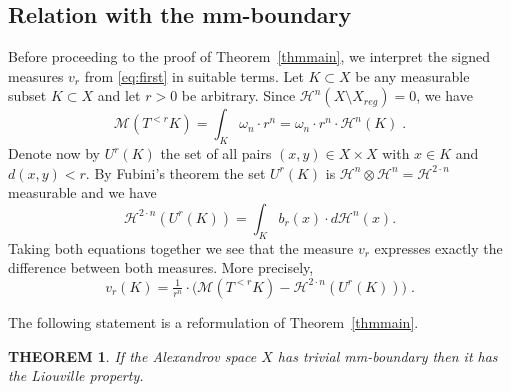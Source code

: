 \documentclass[12pt,leqno,intlimits]{amsart}
\numberwithin{equation}{section}
\newtheorem{thm}{THEOREM}[section]
\theoremstyle{definition}
\theoremstyle{remark}
\newcommand{\tref}[1]{Theorem~\ref{#1}}
\begin{document}
\subsection{Relation with the mm-boundary}
Before proceeding to the proof of  \tref{thmmain}, we interpret the signed measures $v_r$ from \eqref{eq:first} in suitable terms.
Let $K\subset X$ be   any measurable  subset $K\subset X$ and let $r>0$ be arbitrary.
Since $\mathcal H^n (X\setminus X_{reg} )=0$, we have
$$\mathcal M (T^{<r} K) =\int _K \omega _n \cdot r^n  =\omega _n \cdot r^n \cdot \mathcal H^n (K) \; .$$
Denote now by $U^r(K)$ the set of all pairs $(x,y)\in X\times X$ with $x\in K$ and $d(x,y)<r$.
By Fubini's theorem the set $U^r(K)$ is $\mathcal H^n \otimes \mathcal H^n =\mathcal H^{2\cdot n}$ measurable and we have
$$\mathcal H^{2\cdot n} (U^r (K))= \int _K b_r (x)\cdot   d\mathcal H^n (x). $$
Taking both equations  together we see that the measure $v_r$ expresses exactly the difference between both measures. More precisely,
\begin{equation} \label{eq:compare}
v_r (K) = \tfrac 1 {r^n} \cdot \Big(\mathcal M (T^{<r} K)- \mathcal H^{2\cdot n} (U^r (K)) \Big)\;.
\end{equation}

The following statement is a reformulation of \tref{thmmain}.

\begin{thm} \label{reform}
If the Alexandrov space $X$ has trivial mm-boundary then  it has the Liouville property.
\end{thm}
\end{document}
